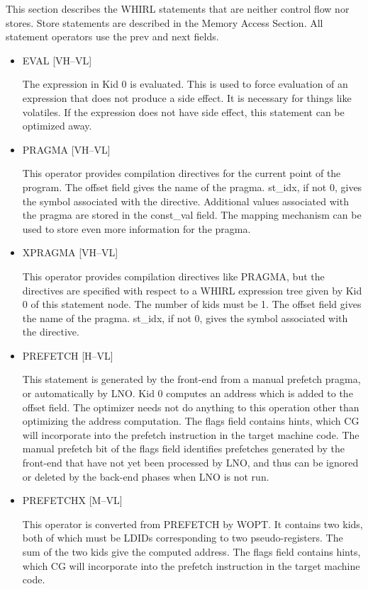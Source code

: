 \documentclass{article}
\begin{document}
This section describes the WHIRL statements that are neither
control flow nor stores. Store statements are described in the Memory
Access Section. All statement operators use the prev and next
fields. 
\begin{itemize}

\item  EVAL \hfill [VH--VL]

The expression in Kid 0 is evaluated. This is used to force evaluation
of an expression that does not produce a side effect. It is necessary
for things like volatiles. If the expression does not have side effect,
this statement can be optimized away.

\item  PRAGMA \hfill [VH--VL]

This operator provides compilation directives for the current point
of the program. The offset field gives the name of the pragma.
st\_idx, if not 0,
gives the symbol associated with the directive. Additional values
associated with the pragma are stored in the const\_val field. The
mapping mechanism can be used to store even more information for
the pragma. 

\item  XPRAGMA \hfill [VH--VL]

This operator provides compilation directives like PRAGMA, but the
directives are specified with respect to a WHIRL expression tree
given by
Kid 0 of this statement node. The number of kids must be 1. The
offset field gives the name of the pragma. st\_idx, if not 0, gives
the symbol associated with the directive. 

\item  PREFETCH \hfill \hfill [H--VL]

This statement is generated by the front-end from a manual
prefetch pragma, or automatically by LNO. Kid 0 computes an address
which is added to the offset field. The optimizer needs not do anything to
this operation other than optimizing the address computation. The
flags field contains hints, which CG will incorporate into the
prefetch instruction in the target machine code. The manual prefetch
bit of the flags field identifies prefetches generated by the
front-end that have not yet been processed by LNO, and thus can
be ignored or deleted by the back-end phases when LNO is not run.


\item  PREFETCHX \hfill [M--VL]

This operator is converted from PREFETCH by WOPT. It contains
two kids, both of which must be
LDIDs corresponding to two pseudo-registers. The sum of the two kids
give the computed address. The flags field contains hints, which
CG will incorporate into the prefetch instruction in the target
machine code.


\end{itemize}
\end{document}
